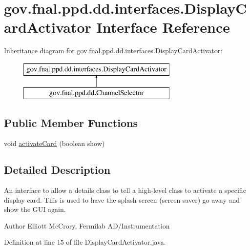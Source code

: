 \hypertarget{interfacegov_1_1fnal_1_1ppd_1_1dd_1_1interfaces_1_1DisplayCardActivator}{\section{gov.\-fnal.\-ppd.\-dd.\-interfaces.\-Display\-Card\-Activator Interface Reference}
\label{interfacegov_1_1fnal_1_1ppd_1_1dd_1_1interfaces_1_1DisplayCardActivator}
}
Inheritance diagram for gov.\-fnal.\-ppd.\-dd.\-interfaces.\-Display\-Card\-Activator\-:\begin{figure}[H]
\begin{center}
\leavevmode
\includegraphics[height=2.000000cm]{interfacegov_1_1fnal_1_1ppd_1_1dd_1_1interfaces_1_1DisplayCardActivator}
\end{center}
\end{figure}
\subsection*{Public Member Functions}
\begin{DoxyCompactItemize}
\item 
void \hyperlink{interfacegov_1_1fnal_1_1ppd_1_1dd_1_1interfaces_1_1DisplayCardActivator_a76f499c19694618b4cd1830a65c56783}{activate\-Card} (boolean show)
\end{DoxyCompactItemize}


\subsection{Detailed Description}
An interface to allow a details class to tell a high-\/level class to activate a specific display card. This is used to have the splash screen (screen saver) go away and show the G\-U\-I again.

\begin{DoxyAuthor}{Author}
Elliott Mc\-Crory, Fermilab A\-D/\-Instrumentation 
\end{DoxyAuthor}


Definition at line 15 of file Display\-Card\-Activator.\-java.



